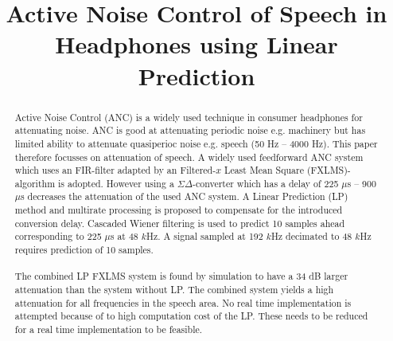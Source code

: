 \documentclass[conference]{IEEEtran}
\begin{document}
\title{Active Noise Control of Speech in Headphones using Linear Prediction}

\author{
}

\maketitle

\begin{abstract}
Active Noise Control (ANC) is a widely used technique in consumer headphones for attenuating noise. ANC is good at attenuating periodic noise e.g. machinery but has limited ability to attenuate quasiperioc noise e.g. speech (50 Hz -- 4000 Hz). This paper therefore focusses on attenuation of speech. A widely used feedforward ANC system which uses an FIR-filter adapted by an Filtered-$x$ Least Mean Square (FXLMS)-algorithm is adopted. However using a $\Sigma\Delta$-converter which has a delay of 225 $\mu$s -- 900 $\mu$s decreases the attenuation of the used ANC system. A Linear Prediction (LP) method and multirate processing is proposed to compensate for the introduced conversion delay. Cascaded Wiener filtering is used to predict 10 samples ahead corresponding to 225 $\mu$s at 48 $k$Hz. A signal sampled at 192 $k$Hz decimated to 48 $k$Hz requires prediction of 10 samples.  
\\\\
The combined LP FXLMS system is found by simulation to have a 34 dB larger attenuation than the system without LP. The combined system yields a high attenuation for all frequencies in the speech area. No real time implementation is attempted because of to high computation cost of the LP. These needs to be reduced for a real time implementation to be feasible.           
\end{abstract}

\IEEEpeerreviewmaketitle












\end{document}
